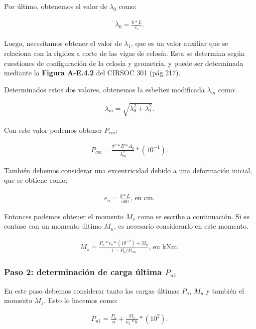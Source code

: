 \documentclass[../main.tex]{subfiles}
\begin{document}
Por último, obtenemos el valor de $\lambda_0$ como:

\begin{align*}
  \lambda_0 = \frac{k*L}{r_c}
.\end{align*}

Luego, necesitamos obtener el valor de $\lambda_1$, que es un valor auxiliar que
se relaciona con la rigidez a corte de las vigas de celosía. Esta se determina
según cuestiones de configuración de la celosía y geometría, y puede ser
determinada mediante la \textbf{Figura A-E.4.2} del CIRSOC 301 (pág 217).

Determinados estos dos valores, obtenemos la esbeltez modificada $\lambda_m$
como:

\begin{align*}
  \lambda_m = \sqrt{\lambda_0^2 + \lambda_1^2} 
.\end{align*}

Con este valor podemos obtener $P_{cm}$:

\begin{align*}
  P_{cm} = \frac{\pi^2 * E * A_g}{\lambda_m^2} *(10^{-1})
.\end{align*}

También debemos considerar una excentricidad debido a una deformación inicial,
que se obtiene como:

\begin{align*}
  e_o = \frac{k*L}{500} \text{, en cm}
.\end{align*}

Entonces podemos obtener el momento $M_s$ como se escribe a continuación. Si se
contase con un momento último $M_u$, es necesario considerarlo en este momento.

 \begin{align*}
   M_s = \frac{P_u*e_o* (10^{-2})+M_u}{1-P_u /P_{cm}} \text{, en kNm}
.\end{align*}

\subsubsection{Paso 2: determinación de carga última $P_{u1}$}

En este paso debemos considerar tanto las cargas últimas $P_u$,  $M_u$ y  también
el momento $M_s$. Esto lo hacemos como:

 \begin{align*}
   P_{u1} = \frac{P_u}{n} + \frac{M_s}{n_1*h} * (10^2)
.\end{align*}
\end{document}
